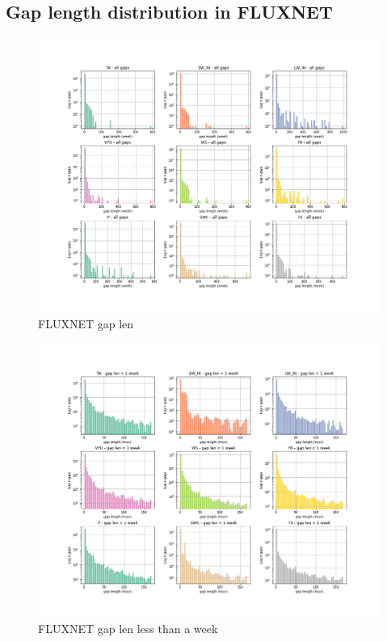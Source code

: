 \documentclass{article}
\newcommand{\imgwidth}{6in}
\let\Oldsubsection\subsection
\renewcommand{\subsection}{\FloatBarrier\Oldsubsection}
\begin{document}
\subsection{Gap length distribution in FLUXNET}
\begin{figure}
\centerline{\includegraphics[width=\imgwidth]{gap_len_dist}}
\caption{FLUXNET gap len}
\label{fig:gap_len_dist}
\end{figure}
\begin{figure}
\centerline{\includegraphics[width=\imgwidth]{gap_len_dist_small}}
\caption{FLUXNET gap len less than a week}
\label{fig:gap_len_dist_small}
\end{figure}
\end{document}
